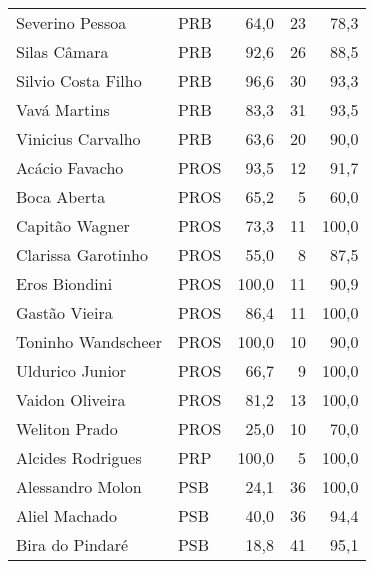 \begin{longtable}{llrrr}
                     Severino Pessoa &            PRB &      64,0 &           23 &       78,3 \\
                        Silas Câmara &            PRB &      92,6 &           26 &       88,5 \\
                  Silvio Costa Filho &            PRB &      96,6 &           30 &       93,3 \\
                        Vavá Martins &            PRB &      83,3 &           31 &       93,5 \\
                   Vinicius Carvalho &            PRB &      63,6 &           20 &       90,0 \\
                      Acácio Favacho &           PROS &      93,5 &           12 &       91,7 \\
                         Boca Aberta &           PROS &      65,2 &            5 &       60,0 \\
                      Capitão Wagner &           PROS &      73,3 &           11 &      100,0 \\
                  Clarissa Garotinho &           PROS &      55,0 &            8 &       87,5 \\
                       Eros Biondini &           PROS &     100,0 &           11 &       90,9 \\
                       Gastão Vieira &           PROS &      86,4 &           11 &      100,0 \\
                  Toninho Wandscheer &           PROS &     100,0 &           10 &       90,0 \\
                     Uldurico Junior &           PROS &      66,7 &            9 &      100,0 \\
                     Vaidon Oliveira &           PROS &      81,2 &           13 &      100,0 \\
                       Weliton Prado &           PROS &      25,0 &           10 &       70,0 \\
                   Alcides Rodrigues &            PRP &     100,0 &            5 &      100,0 \\
                    Alessandro Molon &            PSB &      24,1 &           36 &      100,0 \\
                       Aliel Machado &            PSB &      40,0 &           36 &       94,4 \\
                     Bira do Pindaré &            PSB &      18,8 &           41 &       95,1 \\

\end{longtable}
